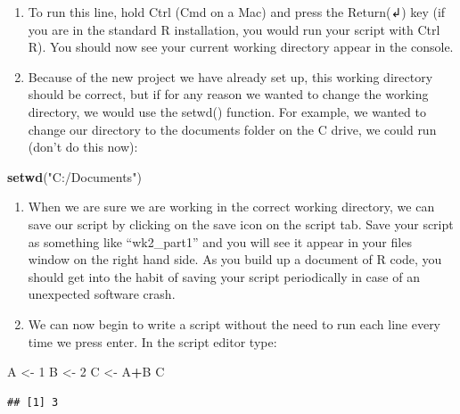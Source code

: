 \documentclass[]{book}
\newenvironment{Shaded}{\begin{snugshade}}{\end{snugshade}}
\newcommand{\DecValTok}[1]{\textcolor[rgb]{0.00,0.00,0.81}{#1}}
\newcommand{\KeywordTok}[1]{\textcolor[rgb]{0.13,0.29,0.53}{\textbf{#1}}}
\newcommand{\NormalTok}[1]{#1}
\newcommand{\OperatorTok}[1]{\textcolor[rgb]{0.81,0.36,0.00}{\textbf{#1}}}
\newcommand{\StringTok}[1]{\textcolor[rgb]{0.31,0.60,0.02}{#1}}
\begin{document}
\begin{enumerate}
\def\labelenumi{\arabic{enumi}.}
\setcounter{enumi}{4}
\item
  To run this line, hold Ctrl (Cmd on a Mac) and press the Return(↲) key (if you are in the standard R installation, you would run your script with Ctrl R). You should now see your current working directory appear in the console.
\item
  Because of the new project we have already set up, this working directory should be correct, but if for any reason we wanted to change the working directory, we would use the setwd() function. For example, we wanted to change our directory to the documents folder on the C drive, we could run (don't do this now):
\end{enumerate}

\begin{Shaded}
\begin{Highlighting}[]
\KeywordTok{setwd}\NormalTok{(}\StringTok{"C:/Documents"}\NormalTok{)}
\end{Highlighting}
\end{Shaded}

\begin{enumerate}
\def\labelenumi{\arabic{enumi}.}
\setcounter{enumi}{6}
\item
  When we are sure we are working in the correct working directory, we can save our script by clicking on the save icon on the script tab. Save your script as something like ``wk2\_part1'' and you will see it appear in your files window on the right hand side. As you build up a document of R code, you should get into the habit of saving your script periodically in case of an unexpected software crash.
\item
  We can now begin to write a script without the need to run each line every time we press enter. In the script editor type:
\end{enumerate}

\begin{Shaded}
\begin{Highlighting}[]
\NormalTok{A <-}\StringTok{ }\DecValTok{1}
\NormalTok{B <-}\StringTok{ }\DecValTok{2}
\NormalTok{C <-}\StringTok{ }\NormalTok{A}\OperatorTok{+}\NormalTok{B}
\NormalTok{C}
\end{Highlighting}
\end{Shaded}

\begin{verbatim}
## [1] 3
\end{verbatim}
\end{document}
